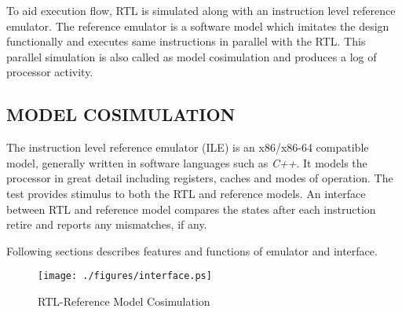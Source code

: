 To aid execution flow, RTL is simulated along with an instruction level reference emulator. The reference emulator is a software model which imitates the design functionally and executes same instructions in parallel with the RTL. This parallel simulation is also called as model cosimulation and produces a log of processor activity.


\subsection {MODEL COSIMULATION}
The instruction level reference emulator (ILE)  is an x86/x86-64 compatible model, generally written in software languages such as {\it C++}. It models the processor in great detail including registers, caches and modes of operation. The test provides stimulus to both the RTL and reference models. An interface between RTL and reference model compares the states after each instruction retire and reports any mismatches, if any. 

Following sections describes features and functions of emulator and interface. 



\begin{figure}[h]
\centering
\texttt{[image: ./figures/interface.ps]}
\caption{RTL-Reference Model Cosimulation} 
\label{fig:interface.ps}
\end{figure}





